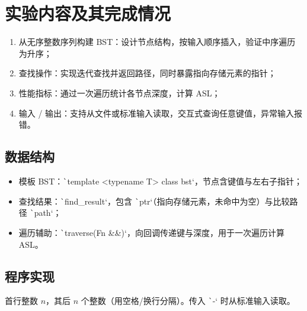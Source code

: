 \documentclass[12pt, a4paper]{ctexart}
\begin{document}
\section{实验内容及其完成情况}

\begin{enumerate}
    \item 从无序整数序列构建 BST：设计节点结构，按输入顺序插入，验证中序遍历为升序；
    \item 查找操作：实现迭代查找并返回路径，同时暴露指向存储元素的指针；
    \item 性能指标：通过一次遍历统计各节点深度，计算 ASL；
    \item 输入 / 输出：支持从文件或标准输入读取，交互式查询任意键值，异常输入报错。
\end{enumerate}

\subsection{数据结构}

\begin{itemize}
    \item 模板 BST：\texttt`template <typename T> class bst`，节点含键值与左右子指针；
    \item 查找结果：\texttt`find_result`，包含 \texttt`ptr`（指向存储元素，未命中为空）与比较路径 \texttt`path`；
    \item 遍历辅助：\texttt`traverse(Fn &&)`，向回调传递键与深度，用于一次遍历计算 ASL。
\end{itemize}

\subsection{程序实现}

首行整数 $n$，其后 $n$ 个整数（用空格/换行分隔）。传入 \texttt`-` 时从标准输入读取。
\end{document}
